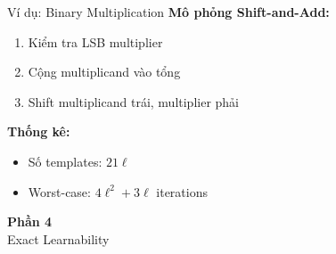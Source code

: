 \begin{frame}{Ví dụ: Binary Multiplication}
  \textbf{Mô phỏng Shift-and-Add:}
  \begin{enumerate}
    \item Kiểm tra LSB multiplier
    \item Cộng multiplicand vào tổng
    \item Shift multiplicand trái, multiplier phải
  \end{enumerate}

  \vspace{0.3cm}
  \textbf{Thống kê:}
  \begin{itemize}
    \item Số templates: $21\ell$
    \item Worst-case: $4\ell^2 + 3\ell$ iterations
  \end{itemize}
\end{frame}

\begin{frame}{}
  \centering
  \vfill
  {\Huge \textbf{Phần 4}}\\[0.5cm]
  {\Large Exact Learnability}
  \vfill
\end{frame}

